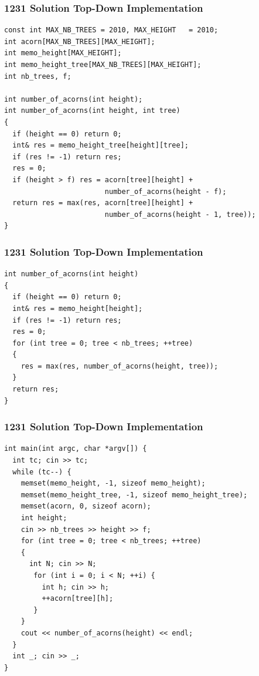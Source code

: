 \documentclass{beamer}
\begin{document}
\begin{frame}[fragile]
\frametitle{1231 Solution Top-Down Implementation}

\scriptsize
\begin{lstlisting}
const int MAX_NB_TREES = 2010, MAX_HEIGHT   = 2010;
int acorn[MAX_NB_TREES][MAX_HEIGHT];
int memo_height[MAX_HEIGHT];
int memo_height_tree[MAX_NB_TREES][MAX_HEIGHT];
int nb_trees, f;

int number_of_acorns(int height);
int number_of_acorns(int height, int tree)
{
  if (height == 0) return 0;
  int& res = memo_height_tree[height][tree];
  if (res != -1) return res;
  res = 0;
  if (height > f) res = acorn[tree][height] +
                        number_of_acorns(height - f);
  return res = max(res, acorn[tree][height] +
                        number_of_acorns(height - 1, tree));
}
\end{lstlisting}

\end{frame}

\begin{frame}[fragile]
\frametitle{1231 Solution Top-Down Implementation}

\scriptsize
\begin{lstlisting}
int number_of_acorns(int height)
{
  if (height == 0) return 0;
  int& res = memo_height[height];
  if (res != -1) return res;
  res = 0;
  for (int tree = 0; tree < nb_trees; ++tree)
  {
    res = max(res, number_of_acorns(height, tree));
  }
  return res;
}
\end{lstlisting}

\end{frame}

\begin{frame}[fragile]
\frametitle{1231 Solution Top-Down Implementation}

\scriptsize
\begin{lstlisting}
int main(int argc, char *argv[]) {
  int tc; cin >> tc;
  while (tc--) {
    memset(memo_height, -1, sizeof memo_height);
    memset(memo_height_tree, -1, sizeof memo_height_tree);
    memset(acorn, 0, sizeof acorn);
    int height;
    cin >> nb_trees >> height >> f;
    for (int tree = 0; tree < nb_trees; ++tree)
    {
      int N; cin >> N;
       for (int i = 0; i < N; ++i) {
         int h; cin >> h;
         ++acorn[tree][h];
       }
    }
    cout << number_of_acorns(height) << endl;
  }
  int _; cin >> _;
}
\end{lstlisting}

\end{frame}
\end{document}
